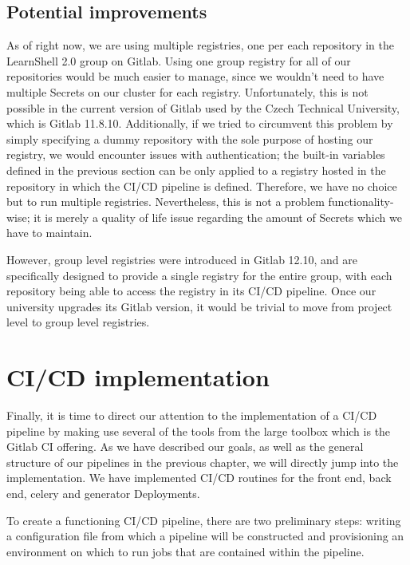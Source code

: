 \documentclass[thesis=B,english]{FITthesis}[2019/12/23]
\begin{document}
\subsection{Potential improvements}

As of right now, we are using multiple registries, one per each repository in the LearnShell 2.0 group on Gitlab. Using one group registry for all of our repositories would be much easier to manage, since we wouldn't need to have multiple Secrets on our cluster for each registry. Unfortunately, this is not possible in the current version of Gitlab used by the Czech Technical University, which is Gitlab 11.8.10. Additionally, if we tried to circumvent this problem by simply specifying a dummy repository with the sole purpose of hosting our registry, we would encounter issues with authentication; the built-in variables defined in the previous section can be only applied to a registry hosted in the repository in which the CI/CD pipeline is defined. Therefore, we have no choice but to run multiple registries. Nevertheless, this is not a problem functionality-wise; it is merely a quality of life issue regarding the amount of Secrets which we have to maintain.

However, group level registries were introduced in Gitlab 12.10, and are specifically designed to provide a single registry for the entire group, with each repository being able to access the registry in its CI/CD pipeline. Once our university upgrades its Gitlab version, it would be trivial to move from project level to group level registries.


\section{CI/CD implementation}

Finally, it is time to direct our attention to the implementation of a CI/CD pipeline by making use several of the tools from the large toolbox which is the Gitlab CI offering. As we have described our goals, as well as the general structure of our pipelines in the previous chapter, we will directly jump into the implementation. We have implemented CI/CD routines for the front end, back end, celery and generator Deployments.

To create a functioning CI/CD pipeline, there are two preliminary steps: writing a configuration file from which a pipeline will be constructed and provisioning an environment on which to run jobs that are contained within the pipeline.
\end{document}
